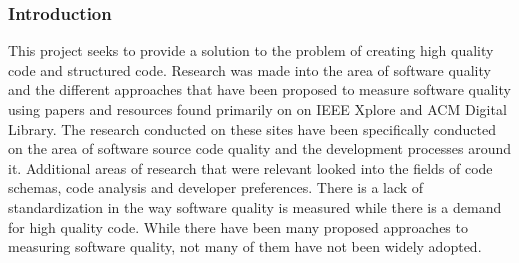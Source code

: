 \subsubsection{Introduction} %
This project seeks to provide a solution to the problem of creating high quality code and structured code. Research was made into the area of software quality and the different approaches that have been proposed to measure software quality using papers and resources found primarily on on IEEE Xplore and ACM Digital Library. The research conducted on these sites have been specifically conducted on the area of software source code quality and the development processes around it. Additional areas of research that were relevant looked into the fields of code schemas, code analysis and developer preferences. 
There is a lack of standardization in the way software quality is measured while there is a demand for high quality code. While there have been many proposed approaches to measuring software quality, not many of them have not been widely adopted.

